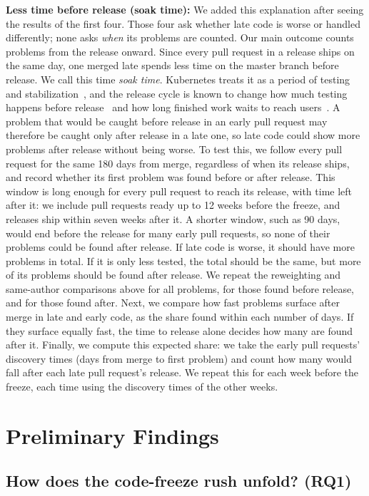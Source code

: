 \documentclass[10pt,conference]{IEEEtran}
\begin{document}
\textbf{Less time before release (soak time):} We added this explanation after seeing the results of the first four. Those four ask whether late code is worse or handled differently; none asks \emph{when} its problems are counted. Our main outcome counts problems from the release onward. Since every pull request in a release ships on the same day, one merged late spends less time on the master branch before release. We call this time \emph{soak time}. Kubernetes treats it as a period of testing and stabilization~\cite{k8scycle,k8sphases}, and the release cycle is known to change how much testing happens before release~\cite{mantyla2015rapid} and how long finished work waits to reach users~\cite{dacosta2018integration}. A problem that would be caught before release in an early pull request may therefore be caught only after release in a late one, so late code could show more problems after release without being worse. To test this, we follow every pull request for the same 180 days from merge, regardless of when its release ships, and record whether its first problem was found before or after release. This window is long enough for every pull request to reach its release, with time left after it: we include pull requests ready up to 12 weeks before the freeze, and releases ship within seven weeks after it. A shorter window, such as 90 days, would end before the release for many early pull requests, so none of their problems could be found after release. If late code is worse, it should have more problems in total. If it is only less tested, the total should be the same, but more of its problems should be found after release. We repeat the reweighting and same-author comparisons above for all problems, for those found before release, and for those found after. Next, we compare how fast problems surface after merge in late and early code, as the share found within each number of days. If they surface equally fast, the time to release alone decides how many are found after it. Finally, we compute this expected share: we take the early pull requests' discovery times (days from merge to first problem) and count how many would fall after each late pull request's release. We repeat this for each week before the freeze, each time using the discovery times of the other weeks.

\section{Preliminary Findings}

\subsection{How does the code-freeze rush unfold? (RQ1)}
\end{document}
